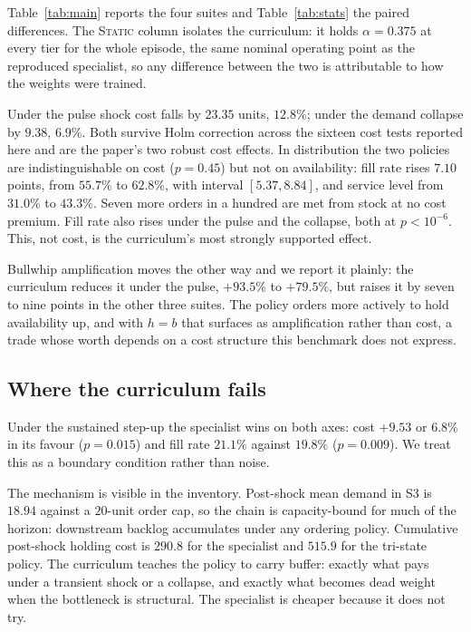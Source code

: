 \documentclass[conference]{IEEEtran}
\begin{document}
Table~\ref{tab:main} reports the four suites and Table~\ref{tab:stats} the
paired differences. The \textsc{Static} column isolates the curriculum: it
holds $\alpha = 0.375$ at every tier for the whole episode, the same nominal
operating point as the reproduced specialist, so any difference between the
two is attributable to how the weights were trained.

Under the pulse shock cost falls by $23.35$ units, $12.8\%$; under the
demand collapse by $9.38$, $6.9\%$. Both survive Holm correction across the
sixteen cost tests reported here and are the paper's two robust cost
effects. In distribution the two policies are indistinguishable on cost
($p = 0.45$) but not on availability: fill rate rises $7.10$ points, from
$55.7\%$ to $62.8\%$, with interval $[5.37, 8.84]$, and service level from
$31.0\%$ to $43.3\%$. Seven more orders in a hundred are met from stock at
no cost premium. Fill rate also rises under the pulse and the collapse, both
at $p < 10^{-6}$. This, not cost, is the curriculum's most strongly
supported effect.

Bullwhip amplification moves the other way and we report it plainly: the
curriculum reduces it under the pulse, $+93.5\%$ to $+79.5\%$, but raises it
by seven to nine points in the other three suites. The policy orders more
actively to hold availability up, and with $h=b$ that surfaces as
amplification rather than cost, a trade whose worth depends on a cost
structure this benchmark does not express.

\subsection{Where the curriculum fails}

Under the sustained step-up the specialist wins on both axes: cost $+9.53$
or $6.8\%$ in its favour ($p = 0.015$) and fill rate $21.1\%$ against
$19.8\%$ ($p = 0.009$). We treat this as a boundary condition rather than
noise.

The mechanism is visible in the inventory. Post-shock mean demand in S3 is
$18.94$ against a $20$-unit order cap, so the chain is capacity-bound for
much of the horizon: downstream backlog accumulates under any ordering
policy. Cumulative post-shock holding cost is $290.8$ for the specialist and
$515.9$ for the tri-state policy. The curriculum teaches the policy to carry
buffer: exactly what pays under a transient shock or a collapse, and
exactly what becomes dead weight when the bottleneck is structural. The
specialist is cheaper because it does not try.
\end{document}

